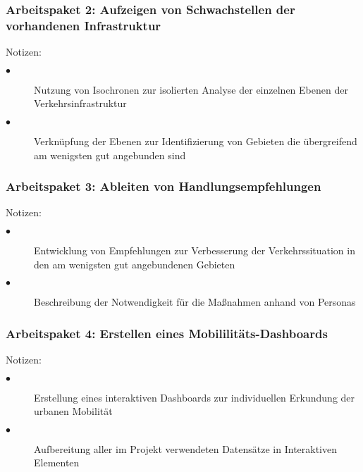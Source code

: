 \subsubsection{Arbeitspaket 2: Aufzeigen von Schwachstellen der vorhandenen Infrastruktur}
Notizen: 
\begin{description}
    \item[$\bullet$] Nutzung von Isochronen zur isolierten Analyse der einzelnen Ebenen der Verkehrsinfrastruktur
    \item[$\bullet$] Verknüpfung der Ebenen zur Identifizierung von Gebieten die übergreifend am wenigsten gut angebunden sind
  \end{description} 

\subsubsection{Arbeitspaket 3: Ableiten von Handlungsempfehlungen}
Notizen:
\begin{description}
    \item[$\bullet$] Entwicklung von Empfehlungen zur Verbesserung der Verkehrssituation in den am wenigsten gut angebundenen Gebieten
    \item[$\bullet$] Beschreibung der Notwendigkeit für die Maßnahmen anhand von Personas
  \end{description} 

\subsubsection{Arbeitspaket 4: Erstellen eines Mobililitäts-Dashboards}
Notizen: 
\begin{description}
    \item[$\bullet$] Erstellung eines interaktiven Dashboards zur individuellen Erkundung der urbanen Mobilität
    \item[$\bullet$] Aufbereitung aller im Projekt verwendeten Datensätze in Interaktiven Elementen
  \end{description} 


